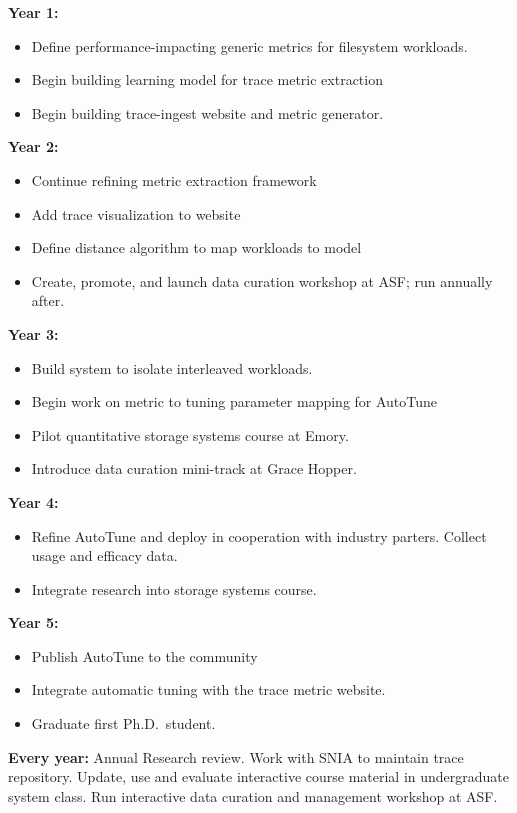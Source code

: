 \noindent
\textbf{Year 1:} 
\begin{itemize}
\item Define performance-impacting generic metrics for filesystem workloads.
\item Begin building learning model for trace metric extraction
\item Begin building trace-ingest website and metric generator.
\end{itemize}
\noindent
\textbf{Year 2:} 
\begin{itemize}
\item Continue refining metric extraction framework
\item Add trace visualization to website
\item Define distance algorithm to map workloads to model
\item Create, promote, and launch data curation workshop at ASF; run annually after.
\end{itemize}

\noindent
\textbf{Year 3:}
\begin{itemize}
\item Build system to isolate interleaved workloads.
\item Begin work on metric to tuning parameter mapping for AutoTune  
\item Pilot quantitative storage systems course at Emory.
\item Introduce data curation mini-track at Grace Hopper.
%
\end{itemize}
\noindent
\textbf{Year 4:} 
%
\begin{itemize}
\item Refine AutoTune and deploy in cooperation with industry parters.  Collect usage and efficacy data.
\item Integrate research into storage systems course. 
\end{itemize}
\noindent
\textbf{Year 5:} 
\begin{itemize}
\item Publish AutoTune to the community
\item Integrate automatic tuning with the trace metric website.
\item Graduate first Ph.D.~student.
\end{itemize}

\noindent
\textbf{Every year:} Annual Research review.  Work with SNIA to maintain trace
repository.
Update, use and evaluate interactive course material in undergraduate system
class.  Run interactive data curation and management workshop at ASF. %



